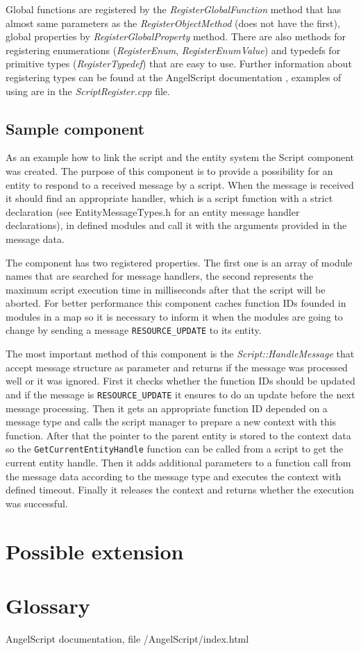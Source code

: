 Global functions are registered by the \emph{RegisterGlobalFunction} method that has almost same parameters as the \emph{RegisterObjectMethod} (does not have the first), global properties by \emph{RegisterGlobalProperty} method. There are also methods for registering enumerations (\emph{RegisterEnum}, \emph{RegisterEnumValue}) and typedefs for primitive types (\emph{RegisterTypedef}) that are easy to use. Further information about registering types can be found at the AngelScript documentation \cite{angelscript}, examples of using are in the \emph{ScriptRegister.cpp} file.

\subsection{Sample component}
\label{script-component}

As an example how to link the script and the entity system the Script component was created. The purpose of this component is to provide a possibility for an entity to respond to a received message by a script. When the message is received it should find an appropriate handler, which is a script function with a strict declaration (see EntityMessageTypes.h for an entity message handler declarations), in defined modules and call it with the arguments provided in the message data.

The component has two registered properties. The first one is an array of module names that are searched for message handlers, the second represents the maximum script execution time in milliseconds after that the script will be aborted. For better performance this component caches function IDs founded in modules in a map so it is necessary to inform it when the modules are going to change by sending a message \verb/RESOURCE_UPDATE/ to its entity.

The most important method of this component is the \emph{Script::Handle\-Me\-ssa\-ge} that accept message structure as parameter and returns if the message was processed well or it was ignored. First it checks whether the function IDs should be updated and if the message is \verb/RESOURCE_UPDATE/ it ensures to do an update before the next message processing. Then it gets an appropriate function ID depended on a message type and calls the script manager to prepare a new context with this function. After that the pointer to the parent entity is stored to the context data so the \verb/GetCurrentEntityHandle/ function can be called from a script to get the current entity handle. Then it adds additional parameters to a function call from the message data according to the message type and executes the context with defined timeout. Finally it releases the context and returns whether the execution was successful.

\section{Possible extension}

\section{Glossary}

\begin{thebibliography}{9}                                                                                                
AngelScript documentation, file /AngelScript/index.html

\end{thebibliography}